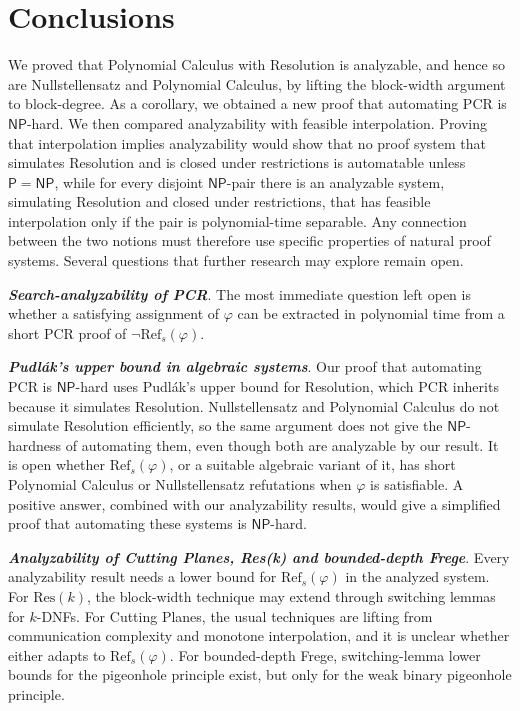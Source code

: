 \chapter*{Conclusions}


We proved that Polynomial Calculus with Resolution is analyzable, and hence so are Nullstellensatz and Polynomial Calculus, by lifting the block-width argument to block-degree. As a corollary, we obtained a new proof that automating PCR is $\mathsf{NP}$-hard. We then compared analyzability with feasible interpolation. Proving that interpolation implies analyzability would show that no proof system that simulates Resolution and is closed under restrictions is automatable unless $\mathsf{P} = \mathsf{NP}$, while for every disjoint $\mathsf{NP}$-pair there is an analyzable system, simulating Resolution and closed under restrictions, that has feasible interpolation only if the pair is polynomial-time separable. Any connection between the two notions must therefore use specific properties of natural proof systems. Several questions that further research may explore remain open.

\textbf{\textit{Search-analyzability of PCR}}. The most immediate question left open is whether a satisfying assignment of $\varphi$ can be extracted in polynomial time from a short PCR proof of $\lnot\mathrm{Ref}_s(\varphi)$.

\textbf{\textit{Pudlák's upper bound in algebraic systems}}. Our proof that automating PCR is $\mathsf{NP}$-hard uses Pudlák's upper bound for Resolution, which PCR inherits because it simulates Resolution. Nullstellensatz and Polynomial Calculus do not simulate Resolution efficiently, so the same argument does not give the $\mathsf{NP}$-hardness of automating them, even though both are analyzable by our result. It is open whether $\mathrm{Ref}_s(\varphi)$, or a suitable algebraic variant of it, has short Polynomial Calculus or Nullstellensatz refutations when $\varphi$ is satisfiable. A positive answer, combined with our analyzability results, would give a simplified proof that automating these systems is $\mathsf{NP}$-hard.

\textbf{\textit{Analyzability of Cutting Planes, Res(k) and bounded-depth Frege}}. Every analyzability result needs a lower bound for $\mathrm{Ref}_s(\varphi)$ in the analyzed system. For $\mathrm{Res}(k)$, the block-width technique may extend through switching lemmas for $k$-DNFs. For Cutting Planes, the usual techniques are lifting from communication complexity and monotone interpolation, and it is unclear whether either adapts to $\mathrm{Ref}_s(\varphi)$. For bounded-depth Frege, switching-lemma lower bounds for the pigeonhole principle exist, but only for the weak binary pigeonhole principle.


